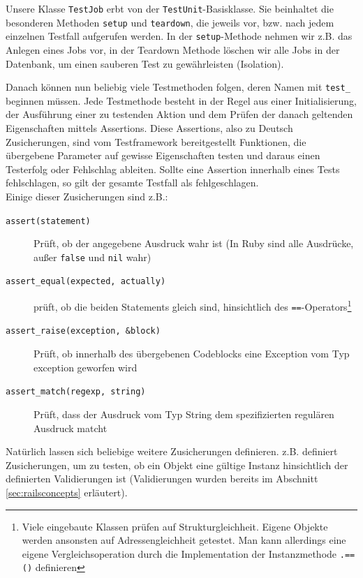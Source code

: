 Unsere Klasse \texttt{TestJob} erbt von der \texttt{TestUnit}-Basisklasse. Sie beinhaltet die besonderen Methoden \texttt{setup} und \texttt{teardown}, die jeweils vor, bzw. nach jedem einzelnen Testfall aufgerufen werden.
In der \texttt{setup}-Methode nehmen wir z.B. das Anlegen eines Jobs vor, in der Teardown Methode löschen wir alle Jobs in der Datenbank, um einen sauberen Test zu gewährleisten (Isolation).

Danach können nun beliebig viele Testmethoden folgen, deren Namen mit \texttt{test\_} beginnen müssen.
Jede Testmethode besteht in der Regel aus einer Initialisierung, der Ausführung einer zu testenden Aktion und dem Prüfen der danach geltenden Eigenschaften mittels Assertions. Diese Assertions, also zu Deutsch Zusicherungen, sind vom Testframework bereitgestellt Funktionen, die übergebene Parameter auf gewisse Eigenschaften testen und daraus einen Testerfolg oder Fehlschlag ableiten. Sollte eine Assertion innerhalb eines Tests fehlschlagen, so gilt der gesamte Testfall als fehlgeschlagen. \\
Einige dieser Zusicherungen sind z.B.:
\begin{description}
 \item[\texttt{assert(statement)}] Prüft, ob der angegebene Ausdruck wahr ist (In Ruby sind alle Ausdrücke, außer \texttt{false} und \texttt{nil} wahr)
 \item[\texttt{assert\_equal(expected, actually)}] prüft, ob die beiden Statements gleich sind, hinsichtlich des \texttt{==}-Operators\footnote{Viele eingebaute Klassen prüfen auf Strukturgleichheit. Eigene Objekte werden ansonsten auf Adressengleichheit getestet. Man kann allerdings eine eigene Vergleichsoperation durch die Implementation der Instanzmethode \texttt{.==()} definieren}

 \item[\texttt{assert\_raise(exception, \&block)}] Prüft, ob innerhalb des übergebenen Codeblocks eine Exception vom Typ exception geworfen wird
 \item[\texttt{assert\_match(regexp, string)}] Prüft, dass der Ausdruck vom Typ String dem spezifizierten regulären Ausdruck matcht
\end{description}
Natürlich lassen sich beliebige weitere Zusicherungen definieren.  z.B. definiert Zusicherungen, um zu testen, ob ein Objekt eine gültige Instanz hinsichtlich der definierten Validierungen ist (Validierungen wurden bereits im Abschnitt \ref{sec:railsconcepts} erläutert).

